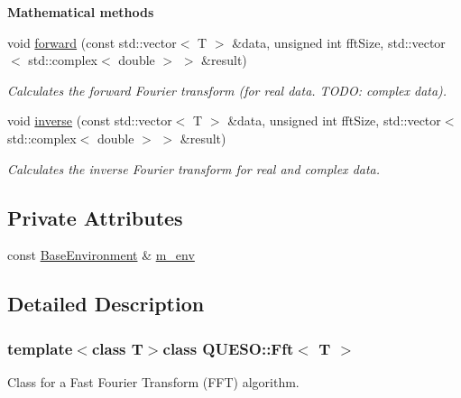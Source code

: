 \begin{Indent}{\bf Mathematical methods}\par
\begin{DoxyCompactItemize}
\item 
void \hyperlink{class_q_u_e_s_o_1_1_fft_a416c250a17337415b02e6545ed622476}{forward} (const std\-::vector$<$ T $>$ \&data, unsigned int fft\-Size, std\-::vector$<$ std\-::complex$<$ double $>$ $>$ \&result)
\begin{DoxyCompactList}\small\item\em Calculates the forward Fourier transform (for real data. T\-O\-D\-O\-: complex data). \end{DoxyCompactList}\item 
void \hyperlink{class_q_u_e_s_o_1_1_fft_a2e1faedd41887115b032b0b45d1f8f58}{inverse} (const std\-::vector$<$ T $>$ \&data, unsigned int fft\-Size, std\-::vector$<$ std\-::complex$<$ double $>$ $>$ \&result)
\begin{DoxyCompactList}\small\item\em Calculates the inverse Fourier transform for real and complex data. \end{DoxyCompactList}\end{DoxyCompactItemize}
\end{Indent}
\subsection*{Private Attributes}
\begin{DoxyCompactItemize}
\item 
const \hyperlink{class_q_u_e_s_o_1_1_base_environment}{Base\-Environment} \& \hyperlink{class_q_u_e_s_o_1_1_fft_a47bda8b9417d43d94b14d0721b6189e2}{m\-\_\-env}
\end{DoxyCompactItemize}


\subsection{Detailed Description}
\subsubsection*{template$<$class T$>$class Q\-U\-E\-S\-O\-::\-Fft$<$ T $>$}

Class for a Fast Fourier Transform (F\-F\-T) algorithm. 

